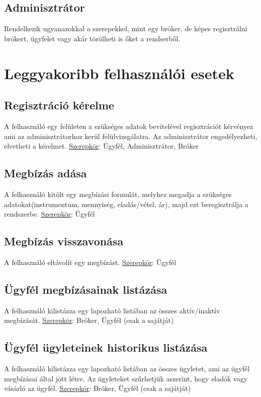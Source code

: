 \subsection{Adminisztrátor}
Rendelkezik ugyanazokkal a szerepekkel, mint egy bróker, de képes regisztrálni brókert, ügyfelet vagy akár törölheti is őket a rendserből.

\section{Leggyakoribb felhasználói esetek}\label{sect:use_case}

\subsection{Regisztráció kérelme}
A felhasználó egy felületen a szükséges adatok bevitelével regisztrációt kérvényez ami az adminisztrátorhoz kerül felülvizsgálatra. Az adminisztrátor engedélyezheti, elvetheti a kérelmet.
\newline \underline{Szerepkör}: Ügyfél, Adminisztrátor, Bróker

\subsection{Megbízás adása}
A felhasználó kitölt egy megbízási formulát, melyhez megadja a szükséges adatokat(instrumentum, mennyiség, eladás/vétel, ár), majd ezt beregisztrálja a rendszerbe.
\newline \underline{Szerepkör}: Ügyfél

\subsection{Megbízás visszavonása}
A felhasználó eltávolít egy megbízást.
\newline \underline{Szerepkör}: Ügyfél

\subsection{Ügyfél megbízásainak listázása}
A felhasználó kilistázza egy lapozható listában az összes aktív/inaktív megbízását.
\newline \underline{Szerepkör}: Bróker, Ügyfél (csak a sajátját)

\subsection{Ügyfél ügyleteinek historikus listázása}
A felhasználó kilistázza egy lapozható listában az összes ügyletet, ami az ügyfél megbízásai által jött létre. Az ügyleteket szűrhetjük aszerint, hogy eladók vagy vásárló az ügyfél.
\newline \underline{Szerepkör}: Bróker, Ügyfél (csak a sajátját)

